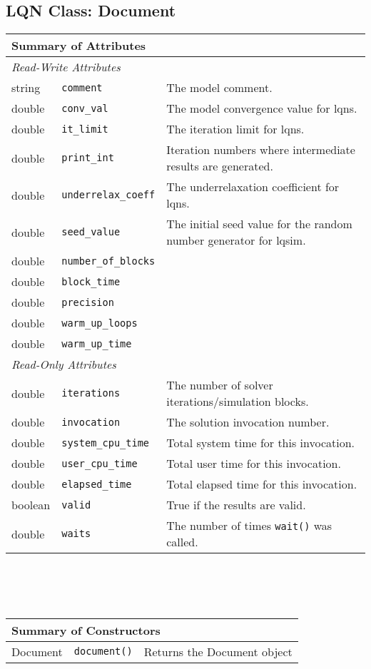 \subsection{LQN Class: Document}
\begin{tabular}{|p{1.0in}|p{2.3in}||p{2.8in}|}
  \hline
  \multicolumn{3}{|l|}{\textbf{Summary of Attributes}}\\
  \hline
  \hline
  \multicolumn{3}{|l|}{\emph{Read-Write Attributes}}\\
  \hline
  string &  {\tt comment} & The model comment. \\
  double &  {\tt conv\_val} & The model convergence value for lqns.\\
  double &  {\tt it\_limit} & The iteration limit for lqns.\\
  double &  {\tt print\_int} & Iteration numbers where intermediate results are generated.\\
  double &  {\tt underrelax\_coeff} & The underrelaxation coefficient for lqns.\\
  double &  {\tt seed\_value} & The initial seed value for the random number generator for lqsim.\\
  double &  {\tt number\_of\_blocks} & \\
  double &  {\tt block\_time} & \\
  double &  {\tt precision} & \\
  double &  {\tt warm\_up\_loops} & \\
  double &  {\tt warm\_up\_time} & \\
  \hline
  \hline
  \multicolumn{3}{|l|}{\emph{Read-Only Attributes}}\\
  \hline
  double &  {\tt iterations} & The number of solver iterations/simulation blocks.\\
  double &  {\tt invocation} & The solution invocation number.\\
  double &  {\tt system\_cpu\_time} & Total system time for this invocation.\\
  double &  {\tt user\_cpu\_time} & Total user time for this invocation.\\
  double &  {\tt elapsed\_time} & Total elapsed time for this invocation.\\
  boolean & {\tt valid} & True if the results are valid.\\
  double &  {\tt waits} & The number of times \texttt{wait()} was called.\\
  \hline
\end{tabular}
\\\\\ \\
\begin{tabular}{|p{1.0in}|p{2.3in}||p{2.8in}|}
  \hline
  \multicolumn{3}{|l|}{\textbf{Summary of Constructors}}\\
  \hline
  Document & {\tt document()} & Returns the Document object\\
  \hline
\end{tabular}

